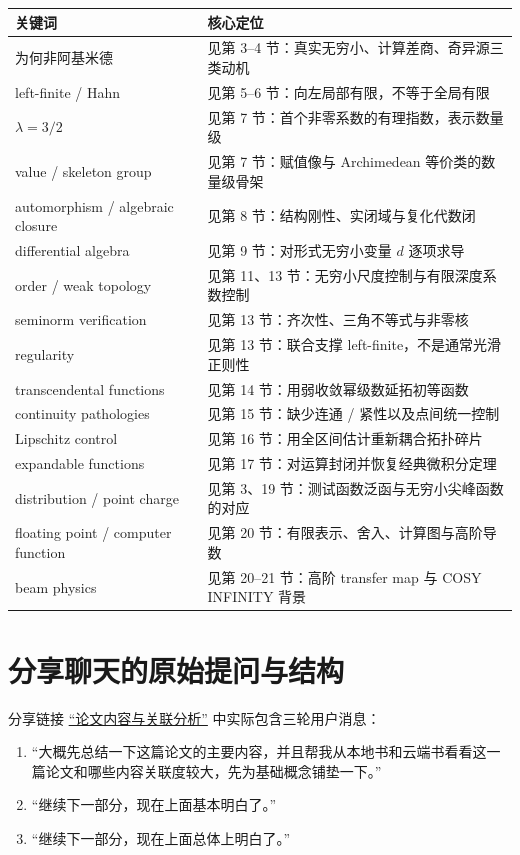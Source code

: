 \documentclass[11pt,a4paper]{article}
\theoremstyle{remark}
\begin{document}
\begin{longtable}{p{}p{}}
\toprule
关键词 & 核心定位\\
\midrule
\endhead
为何非阿基米德 & 见第 3--4 节：真实无穷小、计算差商、奇异源三类动机\\
left-finite / Hahn & 见第 5--6 节：向左局部有限，不等于全局有限\\
$\lambda=3/2$ & 见第 7 节：首个非零系数的有理指数，表示数量级\\
value / skeleton group & 见第 7 节：赋值像与 Archimedean 等价类的数量级骨架\\
automorphism / algebraic closure & 见第 8 节：结构刚性、实闭域与复化代数闭\\
differential algebra & 见第 9 节：对形式无穷小变量 $d$ 逐项求导\\
order / weak topology & 见第 11、13 节：无穷小尺度控制与有限深度系数控制\\
seminorm verification & 见第 13 节：齐次性、三角不等式与非零核\\
regularity & 见第 13 节：联合支撑 left-finite，不是通常光滑正则性\\
transcendental functions & 见第 14 节：用弱收敛幂级数延拓初等函数\\
continuity pathologies & 见第 15 节：缺少连通 / 紧性以及点间统一控制\\
Lipschitz control & 见第 16 节：用全区间估计重新耦合拓扑碎片\\
expandable functions & 见第 17 节：对运算封闭并恢复经典微积分定理\\
distribution / point charge & 见第 3、19 节：测试函数泛函与无穷小尖峰函数的对应\\
floating point / computer function & 见第 20 节：有限表示、舍入、计算图与高阶导数\\
beam physics & 见第 20--21 节：高阶 transfer map 与 COSY INFINITY 背景\\
\bottomrule
\end{longtable}

\section{分享聊天的原始提问与结构}

分享链接
\href{https://chatgpt.com/share/6a528186-461c-83ea-90a8-dae02dc35c59}{“论文内容与关联分析”}
中实际包含三轮用户消息：

\begin{enumerate}
\item “大概先总结一下这篇论文的主要内容，并且帮我从本地书和云端书看看这一篇论文和哪些内容关联度较大，先为基础概念铺垫一下。”
\item “继续下一部分，现在上面基本明白了。”
\item “继续下一部分，现在上面总体上明白了。”
\end{enumerate}
\end{document}
